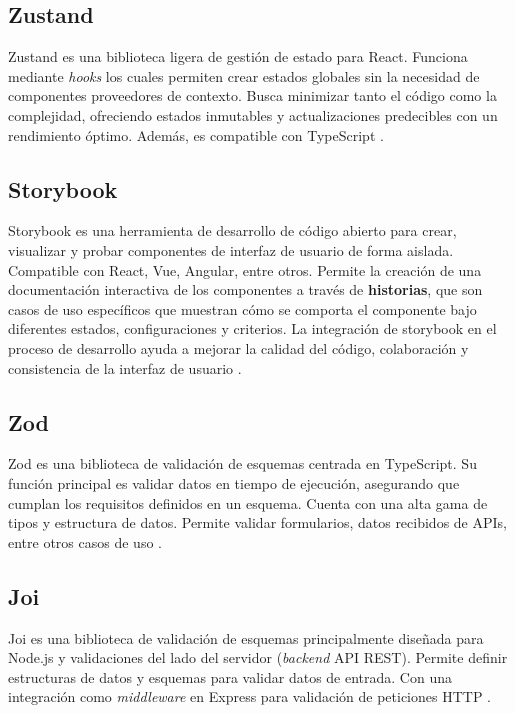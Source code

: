 \subsection{Zustand}
Zustand es una biblioteca ligera de gestión de estado para React. Funciona mediante \textit{hooks} los cuales permiten crear
estados globales sin la necesidad de componentes proveedores de contexto. Busca minimizar tanto el código como la complejidad,
ofreciendo estados inmutables y actualizaciones predecibles con un rendimiento óptimo. Además, es compatible con TypeScript
\cite{zustand2025}.

\subsection{Storybook}
Storybook es una herramienta de desarrollo de código abierto para crear, visualizar y probar componentes de interfaz de usuario
de forma aislada. Compatible con React, Vue, Angular, entre otros. Permite la creación de una documentación interactiva de
los componentes a través de \textbf{historias}, que son casos de uso específicos que muestran cómo se comporta el componente
bajo diferentes estados, configuraciones y criterios. La integración de storybook en el proceso de desarrollo ayuda a mejorar
la calidad del código, colaboración y consistencia de la interfaz de usuario \cite{storybook2025docs}.

\subsection{Zod}
Zod es una biblioteca de validación de esquemas centrada en TypeScript. Su función principal es validar datos en tiempo de
ejecución, asegurando que cumplan los requisitos definidos en un esquema. Cuenta con una alta gama de tipos y estructura de datos.
Permite validar formularios, datos recibidos de APIs, entre otros casos de uso \cite{zod2025introduction}.

\subsection{Joi}
Joi es una biblioteca de validación de esquemas principalmente diseñada para Node.js y validaciones del lado del servidor
(\textit{backend} API REST). Permite definir estructuras de datos y esquemas para validar datos de entrada. Con una integración
como \textit{middleware} en Express para validación de peticiones HTTP \cite{joi2025introduction}.

